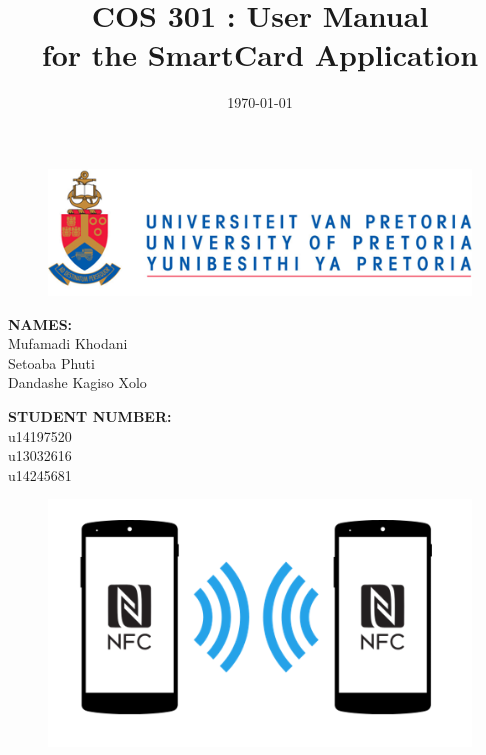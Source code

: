\documentclass[english]{article}
\title{COS 301 : User Manual\\
	for the SmartCard Application\\
	}
\date{\today}
\begin{document}
	\maketitle
	\begin{figure}[!t]
		\includegraphics{up_logo.png}
	\end{figure}
	\begin{minipage}{0.4\textwidth}
		\begin{flushleft} \large
			\textbf{NAMES:}\\[0.4cm]
			Mufamadi {Khodani} \\
			Setoaba {Phuti} \\
			Dandashe {Kagiso Xolo} \\
		\end{flushleft}
	\end{minipage}
	\begin{minipage}{0.4\textwidth}
		\begin{flushright} \large
			\textbf{STUDENT NUMBER:} \\[0.4cm]
			u14197520 \\
			u13032616 \\
			u14245681 \\
		\end{flushright}
\end{minipage}

	
	\newpage

	\tableofcontents
	

	
\newpage
	\begin{figure}[!t]
		\centering
		\includegraphics[scale=0.6]{NFC.png}
	\end{figure}
\end{document}
